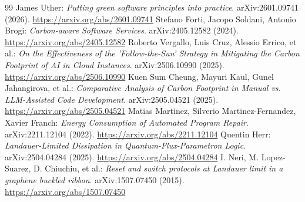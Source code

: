\documentclass[11pt,a4paper]{article}
\begin{document}
\begin{thebibliography}{99}
 James Uther: \emph{Putting green software principles into practice}. arXiv:2601.09741 (2026). \url{https://arxiv.org/abs/2601.09741}
 Stefano Forti, Jacopo Soldani, Antonio Brogi: \emph{Carbon-aware Software Services}. arXiv:2405.12582 (2024). \url{https://arxiv.org/abs/2405.12582}
 Roberto Vergallo, Luis Cruz, Alessio Errico, et al.: \emph{On the Effectiveness of the 'Follow-the-Sun' Strategy in Mitigating the Carbon Footprint of AI in Cloud Instances}. arXiv:2506.10990 (2025). \url{https://arxiv.org/abs/2506.10990}
 Kuen Sum Cheung, Mayuri Kaul, Gunel Jahangirova, et al.: \emph{Comparative Analysis of Carbon Footprint in Manual vs. LLM-Assisted Code Development}. arXiv:2505.04521 (2025). \url{https://arxiv.org/abs/2505.04521}
 Matias Martinez, Silverio Martinez-Fernandez, Xavier Franch: \emph{Energy Consumption of Automated Program Repair}. arXiv:2211.12104 (2022). \url{https://arxiv.org/abs/2211.12104}
 Quentin Herr: \emph{Landauer-Limited Dissipation in Quantum-Flux-Parametron Logic}. arXiv:2504.04284 (2025). \url{https://arxiv.org/abs/2504.04284}
 I. Neri, M. Lopez-Suarez, D. Chiuchiu, et al.: \emph{Reset and switch protocols at Landauer limit in a graphene buckled ribbon}. arXiv:1507.07450 (2015). \url{https://arxiv.org/abs/1507.07450}
\end{thebibliography}
\end{document}
